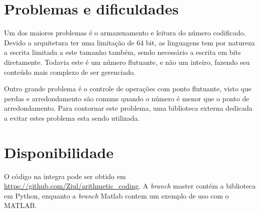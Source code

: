 
\section*{Problemas e dificuldades} %
\label{sec:problemas_e_dificuldades}

Um dos maiores problemas é o armazenamento e leitura do número codificado. Devido a arquitetura ter uma limitação de 64 bit, as linguagens tem por natureza a escrita limitada a este tamanho também, sendo necessário a escrita em bits diretamente. Todavia este é um número flutuante, e não um inteiro, fazendo seu conteúdo mais complexo de ser gerenciado.

Outro grande problema é o controle de operações com ponto flutuante, visto que perdas e arredondamento são comuns quando o número é menor que o ponto de arredondamento. Para contornar este problema, uma biblioteca externa dedicada a evitar estes problema esta sendo utilizada.


\section*{Disponibilidade} %
\label{sec:disponibilidade}
O código na integra pode ser obtido em \url{https://github.com/Ziul/arithmetic_coding}. A \textit{branch} {\ttfamily master} contém a biblioteca em Python, enquanto a \textit{branch} {\ttfamily Matlab} contem um exemplo de uso com o MATLAB.
